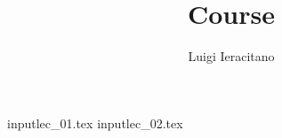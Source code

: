 \documentclass[a4paper]{report}
\title{Course}
\author{Luigi Ieracitano}
\begin{document}
\maketitle
\tableofcontents

input{lec_01.tex}
input{lec_02.tex}
\end{document}

